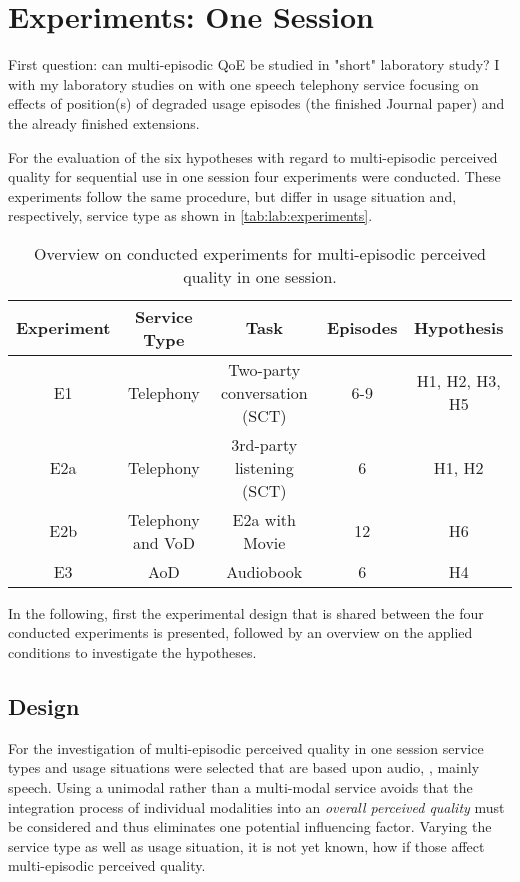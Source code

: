 \chapter{Experiments: One Session}\label{chap:lab}
\begin{chapter-abstract}
First question: can multi-episodic QoE be studied in "short" laboratory study?
I with my laboratory studies on with one speech telephony service focusing on effects of position(s) of degraded usage episodes (the finished Journal paper) and the already finished extensions.
\end{chapter-abstract}

For the evaluation of the six hypotheses with regard to multi-episodic perceived quality for sequential use in one session four experiments were conducted.
These experiments follow the same procedure, but differ in usage situation and, respectively, service type as shown in \autoref{tab:lab:experiments}.

\begin{table}[h]
	\begin{tabulary}{\textwidth}{C|C|C|C|C}
	Experiment	& Service Type 				& Task								& Episodes & Hypothesis \\
	\hline
	E1			& Telephony					& Two-party conversation (\ac{SCT})	& 6-9      & H1, H2, H3, H5 \\
	\hline
	E2a			& Telephony					& 3rd-party listening (\ac{SCT})		& 6        & H1, H2 \\
	\hline
	E2b			& Telephony and \ac{VoD}	& E2a with Movie							& 12       & H6\\
	\hline
	E3			& \ac{AoD}					& Audiobook													& 6        & H4\\
	\end{tabulary}
	\caption{Overview on conducted experiments for multi-episodic perceived quality in one session.}
	\label{tab:lab:experiments}
\end{table}

In the following, first the experimental design that is shared between the four conducted experiments is presented, followed by an overview on the applied conditions to investigate the hypotheses.

\section{Design}
For the investigation of multi-episodic perceived quality in one session service types and usage situations were selected that are based upon audio, \ie, mainly speech.
Using a unimodal rather than a multi-modal service avoids that the integration process of individual modalities into an \emph{overall perceived quality} must be considered and thus eliminates one potential influencing factor.
Varying the service type as well as usage situation, it is not yet known, how if those affect multi-episodic perceived quality.

